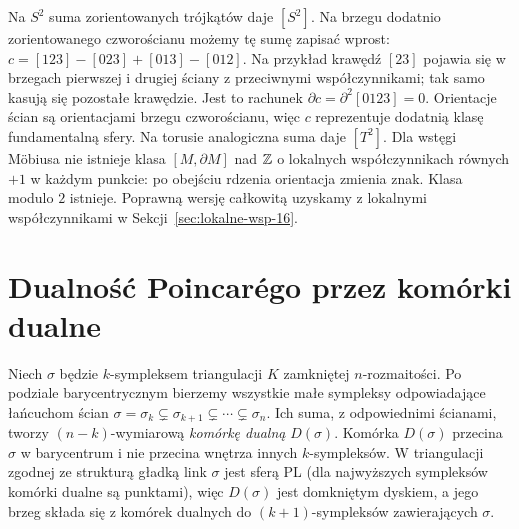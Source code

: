 \begin{przyklad}
Na $S^2$ suma zorientowanych
trójkątów daje $[S^2]$.
Na brzegu dodatnio zorientowanego czworościanu
możemy tę sumę zapisać wprost:
$c=[123]-[023]+[013]-[012]$.
Na przykład krawędź $[23]$ pojawia się w brzegach
pierwszej i drugiej ściany z przeciwnymi współczynnikami;
tak samo kasują się pozostałe krawędzie.
Jest to rachunek $\partial c=\partial^2[0123]=0$.
Orientacje ścian są orientacjami brzegu czworościanu,
więc $c$ reprezentuje dodatnią klasę fundamentalną sfery.
Na torusie analogiczna suma
daje $[T^2]$. Dla wstęgi
Möbiusa nie istnieje
klasa $[M,\partial M]$ nad $\mathbb{Z}$
o lokalnych współczynnikach
równych $+1$ w każdym punkcie:
po obejściu rdzenia orientacja
zmienia znak. Klasa modulo $2$
istnieje. Poprawną wersję
całkowitą uzyskamy z lokalnymi
współczynnikami w
Sekcji~\ref{sec:lokalne-wsp-16}.
\end{przyklad}

\section{Dualność Poincarégo przez komórki dualne}
\label{sec:dualnosc-komorkowa-16}

Niech $\sigma$ będzie $k$-sympleksem
triangulacji $K$ zamkniętej
$n$-rozmaitości. Po podziale
barycentrycznym bierzemy wszystkie
małe sympleksy odpowiadające
łańcuchom ścian
$\sigma=\sigma_k\subsetneq
\sigma_{k+1}\subsetneq\cdots
\subsetneq\sigma_n$.
Ich suma, z odpowiednimi
ścianami, tworzy
$(n-k)$-wymiarową
\emph{komórkę dualną} $D(\sigma)$.
Komórka $D(\sigma)$ przecina
$\sigma$ w barycentrum i nie
przecina wnętrza innych
$k$-sympleksów. W triangulacji zgodnej ze strukturą gładką link
$\sigma$ jest sferą PL (dla najwyższych sympleksów
komórki dualne są punktami), więc
$D(\sigma)$ jest domkniętym
dyskiem, a jego brzeg składa
się z komórek dualnych do
$(k+1)$-sympleksów
zawierających $\sigma$.

